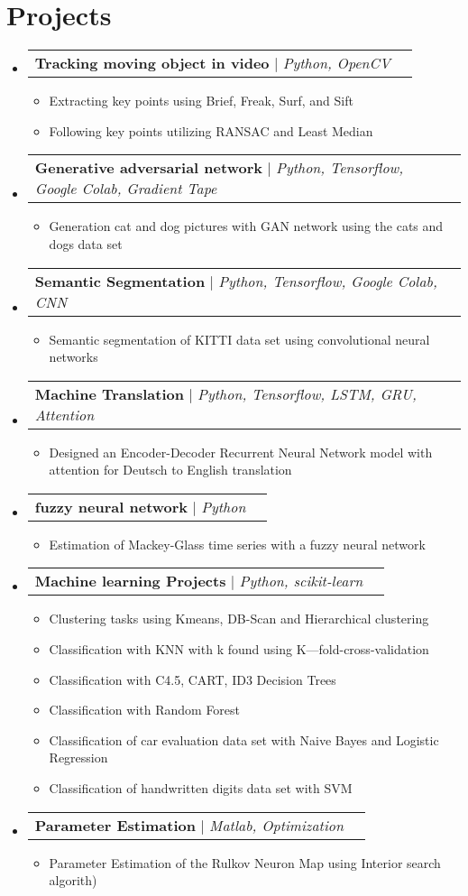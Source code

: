 \documentclass[letterpaper,11pt]{article}
\makeatletter
\newcommand{\resumeItem}[1]{
  \item\small{
    {#1 \vspace{-2pt}}
  }
}
\newcommand{\resumeProjectHeading}[2]{
    \item
    \begin{tabular*}{0.97\textwidth}{l@{\extracolsep{\fill}}r}
      \small#1 & #2 \\
    \end{tabular*}\vspace{-7pt}
}
\newcommand{\resumeSubHeadingListStart}{\begin{itemize}[leftmargin=0.15in, label={}]}
\newcommand{\resumeSubHeadingListEnd}{\end{itemize}}
\newcommand{\resumeItemListStart}{\begin{itemize}}
\newcommand{\resumeItemListEnd}{\end{itemize}\vspace{-5pt}}
\makeatother
\begin{document}
\section{Projects}
    \resumeSubHeadingListStart
      \resumeProjectHeading
          {\textbf{Tracking moving object in video} $|$ \emph{Python, OpenCV}}{}
          \resumeItemListStart
            \resumeItem{Extracting key points using Brief, Freak, Surf, and Sift}
            \resumeItem{Following key points utilizing RANSAC and Least Median}
          \resumeItemListEnd
      \resumeProjectHeading
          {\textbf{Generative adversarial network} $|$ \emph{Python, Tensorflow, Google Colab, Gradient Tape}}{}
          \resumeItemListStart
            \resumeItem{Generation cat and dog pictures with GAN network using the cats and dogs data set}
          \resumeItemListEnd
      \resumeProjectHeading
          {\textbf{Semantic Segmentation} $|$ \emph{Python, Tensorflow, Google Colab, CNN}}{}
          \resumeItemListStart
            \resumeItem{Semantic segmentation of KITTI data set using convolutional neural networks}
          \resumeItemListEnd
      \resumeProjectHeading
          {\textbf{Machine Translation} $|$ \emph{Python, Tensorflow, LSTM, GRU, Attention}}{}
          \resumeItemListStart
            \resumeItem{Designed an Encoder-Decoder Recurrent Neural Network model with attention for Deutsch to English translation}
          \resumeItemListEnd
      \resumeProjectHeading
          {\textbf{fuzzy neural network} $|$ \emph{Python}}{}
          \resumeItemListStart
            \resumeItem{Estimation of Mackey-Glass time series with a fuzzy neural network}
          \resumeItemListEnd
      \resumeProjectHeading
          {\textbf{Machine learning Projects} $|$ \emph{Python, scikit-learn}}{}
          \resumeItemListStart
            \resumeItem{Clustering tasks using  Kmeans, DB-Scan and Hierarchical clustering }
            \resumeItem{Classification with KNN with k found using K—fold-cross-validation}
            \resumeItem{Classification with  C4.5, CART, ID3 Decision Trees}
            \resumeItem{Classification with Random Forest}
            \resumeItem{Classification of car evaluation data set with Naive Bayes and Logistic Regression}
            \resumeItem{Classification of handwritten digits data set with SVM}
          \resumeItemListEnd
      \resumeProjectHeading
        {\textbf{Parameter Estimation} $|$ \emph{Matlab, Optimization}}{}
        \resumeItemListStart
            \resumeItem{Parameter Estimation of the Rulkov Neuron Map using Interior search algorith)}
        \resumeItemListEnd
    \resumeSubHeadingListEnd
\end{document}
